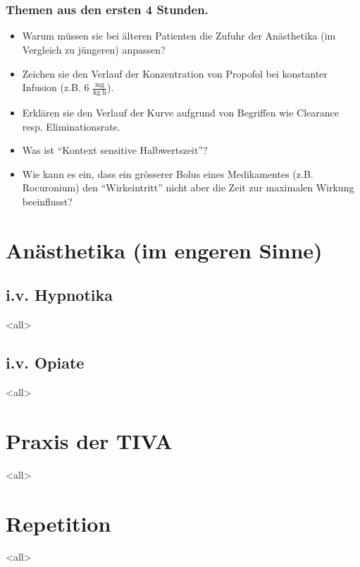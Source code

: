 \section*{}
\vspace{4cm}
\begin{frame}
\frametitle{Themen aus den ersten 4 Stunden.}
\begin{itemize}[<+->]
	\item Warum m\"ussen sie bei \"alteren Patienten die Zufuhr der An\"asthetika (im Vergleich zu j\"ungeren) anpassen?
	\item Zeichen sie den Verlauf der Konzentration von Propofol bei konstanter Infusion (z.B. 6 $\frac{\text{mg}}{\text{kg h}}$).
	\item Erkl\"aren sie den Verlauf der Kurve aufgrund von Begriffen wie Clearance resp. Eliminationsrate. 
	\vspace{1cm}
	\item Was ist \enquote{Kontext sensitive Halbwertszeit}?
	\item Wie kann es ein, dass ein gr\"osserer Bolus eines Medikamentes (z.B. Rocuronium) den \enquote{Wirkeintritt} nicht aber die Zeit zur maximalen Wirkung beeinflusst?
\end{itemize}
\infina
\end{frame}


\section{An\"asthetika (im engeren Sinne)}
\subsection{i.v. Hypnotika}
\mode<all>


\subsection{i.v. Opiate}
\mode<all>



\section{Praxis der TIVA}
\mode<all>



\section{Repetition}
\mode<all>








